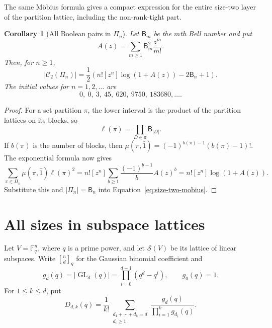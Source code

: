 \documentclass[11pt]{article}
\newtheorem{corollary}[theorem]{Corollary}
\theoremstyle{definition}
\theoremstyle{remark}
\newcommand{\cC}{\mathcal C}
\newcommand{\qbinom}[2]{\genfrac{[}{]}{0pt}{}{#1}{#2}_q}
\begin{document}
The same M\"obius formula gives a compact expression for the entire
size-two layer of the partition lattice, including the non-rank-tight part.

\begin{corollary}[All Boolean pairs in $\Pi_n$]\label{cor:partition-pairs}
Let $\mathsf B_m$ be the $m$th Bell number and put
\[
 A(z)=\sum_{m\ge1}\mathsf B_m^2\frac{z^m}{m!}.
\]
Then, for $n\ge1$,
\begin{equation}\label{eq:partition-pairs}
 |\cC_2(\Pi_n)|=\frac12\left(
 n![z^n]\log(1+A(z))-2\mathsf B_n+1
 \right).
\end{equation}
The initial values for $n=1,2,\ldots$ are
\[
 0,\ 0,\ 3,\ 45,\ 620,\ 9750,\ 183680,\ldots.
\]
\end{corollary}

\begin{proof}
For a set partition $\pi$, the lower interval is the product of the partition
lattices on its blocks, so
\[
 \ell(\pi)=\prod_{D\in\pi}\mathsf B_{|D|}.
\]
If $b(\pi)$ is the number of blocks, then
$\mu(\pi,\hat1)=(-1)^{b(\pi)-1}(b(\pi)-1)!$.  The exponential formula now
gives
\[
 \sum_{\pi\in\Pi_n}\mu(\pi,\hat1)\ell(\pi)^2
 =n![z^n]\sum_{b\ge1}\frac{(-1)^{b-1}}b A(z)^b
 =n![z^n]\log(1+A(z)).
\]
Substitute this and $|\Pi_n|=\mathsf B_n$ into
Equation~\eqref{eq:size-two-mobius}.
\end{proof}

\section{All sizes in subspace lattices}

Let $V=\mathbb F_q^n$, where $q$ is a prime power, and let $\mathcal S(V)$ be
its lattice of linear subspaces.  Write $\qbinom{n}{d}$ for the Gaussian
binomial coefficient and
\[
 g_d(q)=|\operatorname{GL}_d(q)|
       =\prod_{i=0}^{d-1}(q^d-q^i),
 \qquad g_0(q)=1.
\]
For $1\le k\le d$, put
\begin{equation}\label{eq:direct-sum-count}
 D_{d,k}(q)=\frac1{k!}
 \sum_{\substack{d_1+\cdots+d_k=d\\d_i\ge1}}
 \frac{g_d(q)}{\prod_{i=1}^k g_{d_i}(q)}.
\end{equation}
\end{document}
